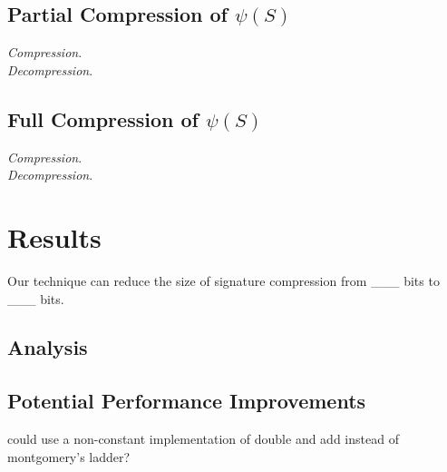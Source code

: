 \subsection{Partial Compression of $\psi(S)$}

\noindent
\textit{Compression}.\\

\noindent
\textit{Decompression}.

\subsection{Full Compression of $\psi(S)$}

\noindent
\textit{Compression}.\\

\noindent
\textit{Decompression}.

\section{Results}

Our technique can reduce the size of \sidh signature compression from \_\_\_ bits to \_\_\_ bits.

\subsection{Analysis}

\subsection{Potential Performance Improvements}

could use a non-constant implementation of double and add instead of montgomery's ladder? 

